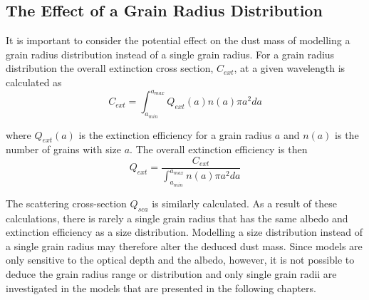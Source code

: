%
%



\subsection{The Effect of a Grain Radius Distribution}
\label{gs_distn}
It is important to consider the potential effect on the dust mass of modelling a grain radius distribution instead of a single grain radius.  For a grain radius distribution the overall extinction cross section, $C_{ext}$, at a given wavelength is calculated as
\begin{equation}
C_{ext}=\int^{a_{max}}_{a_{min}} Q_{ext}(a) n(a) \pi a^2 da 
\end{equation}

where $Q_{ext}(a)$ is the extinction efficiency for a grain radius $a$ and $n(a)$ is the number of grains with size $a$. The overall extinction efficiency is then
\begin{equation} 
Q_{ext} = \frac{C_{ext}}{ \int^{a_{max}}_{a_{min}} n(a) \pi a^2 da} 
\end{equation}
 
The scattering cross-section $Q_{sca}$ is similarly calculated.  As a result of these calculations, there is rarely a single grain radius that has the same albedo and extinction efficiency as a size distribution.  Modelling a size distribution instead of a single grain radius may therefore alter the deduced dust mass.  Since models are only sensitive to the optical depth and the albedo, however, it is not possible to deduce the grain radius range or distribution and only single grain radii are investigated in the models that are presented in the following chapters.

